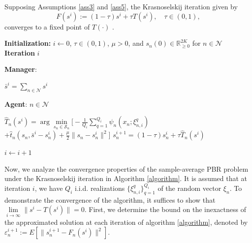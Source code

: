\documentclass[twocolumn]{autart}
\begin{document}
Supposing Assumptions \ref{ass3} and \ref{ass5}, the Krasnoselskij iteration given by 
\begin{equation}\label{krasnoselskij_def}
    F(s^i) := (1-\tau)s^i +\tau T(s^i),\quad \tau\in (0,1),
\end{equation} 
converges to a fixed point of $T(\cdot)$ \cite[Theorem 3.2]{berinde2007iterative}.
\begin{algorithm}[!t]
	\caption{Decentralized VS-PBR with Krasnoselskij Step.}
	\begin{algorithmic}
		\State \textbf{Initialization: } $i\leftarrow0$, $\tau\in(0,1)$, $\mu>0$, and $s_n(0)\in \mathbb{R}_{\geq 0}^{2K}$ for $n \in  {\mathcal{N}}$
		\State \textbf{Iteration} $i$
		\vspace{0.05cm}
		\State\hspace*{0.02\linewidth}\vline
		\vspace{0.05cm} 
		\begin{minipage}{0.98\linewidth}
                \State   \textbf{Manager}: 
			\State\hspace*{0.02\linewidth} \vline
			\begin{minipage}{0.9\linewidth}
				\State\hspace*{0.02\linewidth}$
                \bar{s}^i=\sum_{n\in\mathcal{N}}{s^i}$
			\end{minipage}
			\State   \textbf{Agent}: $n \in  \mathcal{N}$
			\State\hspace*{0.02\linewidth} \vline
			\begin{minipage}{0.9\linewidth}
				\State\hspace*{0.02\linewidth}$\widehat{T}_n(s^i)=\arg\min\limits_{s_n\in\mathcal{S}_n}{}\big[-\frac{1}{Q_i}\sum_{q=1}^{Q_i}{\psi_n(x_n; \xi_{n,i}^q)}$
                \State\hspace*{0.16\linewidth}$+\hat{t}_n(s_n, \bar{s}^i - s_n^i)+\frac{\mu}{2}\|s_n-s_n^i\|^2\big]$
				\State\hspace*{0.01\linewidth} $s_n^{i+1}=(1-\tau)s_n^i+\tau \widehat{T}_n(s^i)$
			\end{minipage}
			\vspace{0.1cm}
			\State ${i}\leftarrow {i}+1$
		\end{minipage}
	\end{algorithmic}
	\label{algorithm}
\end{algorithm}
\par
Now, we analyze the convergence properties of the sample-average PBR problem under the Krasnoselskij iteration in Algorithm \ref{algorithm}. It is assumed that at iteration $i$, we have $Q_i$ i.i.d. realizations $\{\xi_{n,i}^q\}_{q=1}^{Q_i}$ of the random vector $\xi_n$. To demonstrate the convergence of the algorithm, it suffices to show that $\lim\limits_{i\rightarrow\infty}{\|s^i-T(s^i)\|}=0$. First, we determine the bound on the inexactness of the approximated solution at each iteration of algorithm \ref{algorithm}, denoted by $\varepsilon_n^{i+1}:=E[\|s_n^{i+1}-F_n(s^i)\|^2]$.
\end{document}
